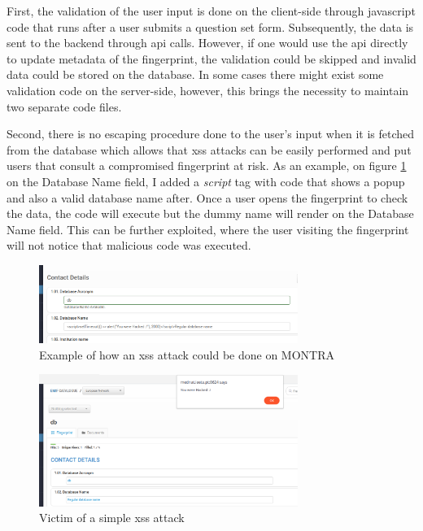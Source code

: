 First, the validation of the user input is done on the client-side through javascript code that runs after a user submits a question set form.
Subsequently, the data is sent to the backend through \gls{api} calls.
However, if one would use the \gls{api} directly to update metadata of the fingerprint, the validation could be skipped and invalid data could be stored on the database.
In some cases there might exist some validation code on the server-side, however, this brings the necessity to maintain two separate code files.

Second, there is no escaping procedure done to the user's input when it is fetched from the database which allows that \gls{xss} attacks can be easily performed and put users that consult a compromised fingerprint at risk.
As an example, on figure \ref{fig:montra-xss-create} on the Database Name field, I added a \textit{script} tag with code that shows a popup and also a valid database name after.
Once a user opens the fingerprint to check the data, the code will execute but the dummy name will render on the Database Name field.
This can be further exploited, where the user visiting the fingerprint will not notice that malicious code was executed.


\begin{figure}[h]
    \center
    \includegraphics[width=0.75\textwidth]{montra-xss-create}
    \caption{Example of how an \gls{xss} attack could be done on MONTRA}
    \label{fig:montra-xss-create}
\end{figure}

\begin{figure}[h]
    \center
    \includegraphics[width=0.75\textwidth]{montra-xss}
    \caption{Victim of a simple \gls{xss} attack}
    \label{fig:montra-xss}
\end{figure}

